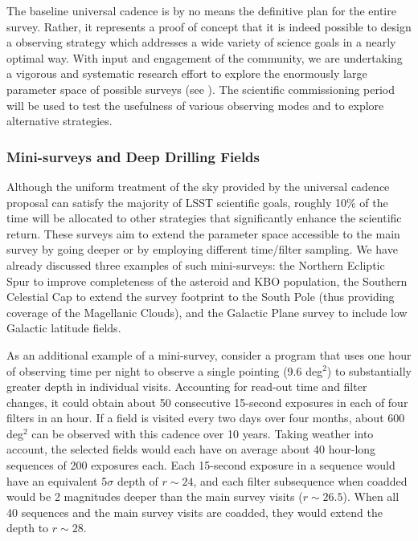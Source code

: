 The baseline universal cadence is by no means the definitive plan for the entire
survey. Rather, it represents a proof of concept that it is indeed possible to
design a observing strategy which addresses a wide variety of science goals in a nearly
optimal way. With input and engagement of the community, we are
undertaking a vigorous and systematic research effort to explore
the enormously large parameter space of possible surveys (see \citealt{2017arXiv170804058L}).
The scientific commissioning period will be used to test the usefulness of various observing
modes and to explore alternative strategies.


\subsubsection{ Mini-surveys and Deep Drilling Fields}
\label{Sec:minisurveys}

Although the uniform treatment of the sky provided by the universal cadence
proposal can satisfy the majority of LSST scientific goals, roughly 10\%
of the time will be allocated to other strategies that significantly enhance the
scientific return.  These surveys aim to extend the parameter space accessible
to the main survey by going deeper or by employing different time/filter
sampling.  We have already discussed three examples of such
mini-surveys: the Northern Ecliptic Spur to improve completeness of
the asteroid and KBO population, the Southern Celestial Cap to extend
the survey footprint to the South Pole (thus providing coverage of the
Magellanic Clouds), and the Galactic Plane survey to include low
Galactic latitude fields.

As an additional  example of a mini-survey, consider a program that
uses one hour of
observing time per night to observe a single pointing (9.6 deg$^2$) to
substantially greater depth in individual visits. Accounting for
read-out time and filter changes, it could obtain about 50 consecutive
15-second exposures in each of four filters in an hour. If a field is visited
every two days over four months, about 600 deg$^2$ can be observed with this
cadence over 10 years. Taking weather into account, the selected fields would
each have on average about 40 hour-long sequences of 200 exposures each. Each
15-second exposure in a sequence would have an equivalent 5$\sigma$ depth of
$r\sim24$, and each filter subsequence when coadded would be 2 magnitudes
deeper than the main survey visits ($r\sim26.5$). When all 40 sequences and
the main survey visits are coadded, they would extend the depth to $r\sim28$.

